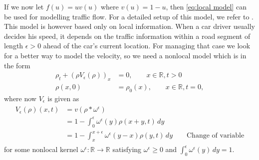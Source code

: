 If we now let $f(u) = uv(u)$ where $v(u)= 1-u$, then \cref{eq:local model} can be used for modelling traffic flow. For a detailed setup of this model, we refer to
\cite{goatinConservationLawsLocal2014}. This model is however based only on local information. When a car driver usually decides his speed, it depends on the traffic information within a road segment
of length $\epsilon > 0$ ahead of the car's current location. For managing that case we look for a better way to model
the velocity, so we need a nonlocal model which is in the form
\begin{equation}\label{eq:nonlocal_model}
    \begin{split}
        \rho_{t} + (\rho V_{\epsilon}(\rho))_{x} & = 0,    \qquad x \in \mathbb{R}, t > 0         \\
        \rho(x,0)                                & = \rho_{0}(x), \qquad x \in \mathbb{R}, t = 0,
    \end{split}
\end{equation}
where now $V_{\epsilon}$ is given as
\begin{equation} \label{eq: nonlocal operator}
    \begin{split}
        \begin{aligned}
            V_{\epsilon}(\rho)(x,t) & = v(\rho*\omega^{\epsilon})                                                                         \\
                                    & = 1- \int_{0}^{\epsilon} \omega^{\epsilon}(y) \rho(x+y,t) \, dy                                     \\
                                    & = 1 - \int_{x}^{x+\epsilon} \omega^{\epsilon}(y-x) \rho(y,t) \, dy \qquad \text{Change of variable}
        \end{aligned}
    \end{split}
\end{equation}
for some nonlocal kernel $\omega^{\epsilon}: \mathbb{R} \rightarrow \mathbb{R}$ satisfying $\omega^{\epsilon} \geq 0$ and $\int_{0}^{\epsilon} \omega^{\epsilon}(y)  \, dy = 1$.


